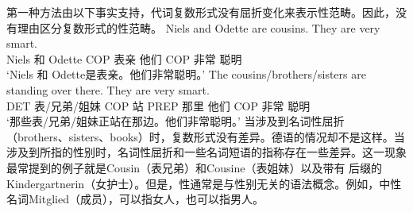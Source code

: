 第一种方法由以下事实支持，代词复数形式没有屈折变化来表示性范畴。因此，没有理由区分复数形式的性范畴。
\eal
\ex 
\gll Niels and Odette are cousins. They are very smart.\\
	Niels 和 Odette COP 表亲 他们 COP 非常 聪明\\
\glt `Niels 和 Odette是表亲。他们非常聪明。'
\ex 
\gll The cousins/brothers/sisters are standing over there. They are very smart.\\
	DET 表/兄弟/姐妹 COP 站 PREP 那里 他们 COP 非常 聪明\\
\glt `那些表/兄弟/姐妹正站在那边。他们非常聪明。'
\zl
当涉及到名词性屈折（brothers、sisters、books）时，复数形式没有差异。德语的情况却不是这样。当涉及到所指的性别时，名词性屈折和一些名词短语的指称存在一些差异。这一现象最常提到的例子就是Cousin（表兄弟）和Cousine（表姐妹）以及带有 后缀的Kindergartnerin（女护士）。但是，性通常是与性别无关的语法概念。例如，中性名词Mitglied（成员），可以指女人，也可以指男人。

